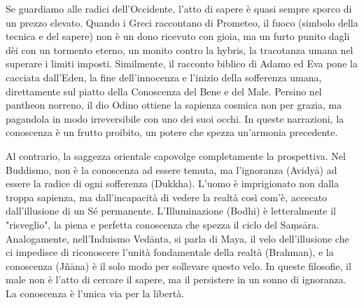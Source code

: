 \documentclass[12pt]{book} %
\begin{document}
\begin{mdframed}[linewidth=1pt]
Se guardiamo alle radici dell'Occidente, l'atto di sapere è quasi sempre sporco di un prezzo elevato. Quando i Greci raccontano di Prometeo, il fuoco (simbolo della tecnica e del sapere) non è un dono ricevuto con gioia, ma un furto punito dagli dèi con un tormento eterno, un monito contro la hybris, la tracotanza umana nel superare i limiti imposti. Similmente, il racconto biblico di Adamo ed Eva pone la cacciata dall'Eden, la fine dell'innocenza e l'inizio della sofferenza umana, direttamente sul piatto della Conoscenza del Bene e del Male. Persino nel pantheon norreno, il dio Odino ottiene la sapienza cosmica non per grazia, ma pagandola in modo irreversibile con uno dei suoi occhi. In queste narrazioni, la conoscenza è un frutto proibito, un potere che spezza un'armonia precedente.

Al contrario, la saggezza orientale capovolge completamente la prospettiva. Nel Buddismo, non è la conoscenza ad essere temuta, ma l'ignoranza (Avidyā) ad essere la radice di ogni sofferenza (Dukkha). L'uomo è imprigionato non dalla troppa sapienza, ma dall'incapacità di vedere la realtà così com'è, accecato dall'illusione di un Sé permanente. L'Illuminazione (Bodhi) è letteralmente il "risveglio", la piena e perfetta conoscenza che spezza il ciclo del Saṃsāra. Analogamente, nell'Induismo Vedānta, si parla di Maya, il velo dell'illusione che ci impedisce di riconoscere l'unità fondamentale della realtà (Brahman), e la conoscenza (Jñāna) è il solo modo per sollevare questo velo. In queste filosofie, il male non è l'atto di cercare il sapere, ma il persistere in un sonno di ignoranza. La conoscenza è l'unica via per la libertà.
\end{mdframed}
\end{document}
